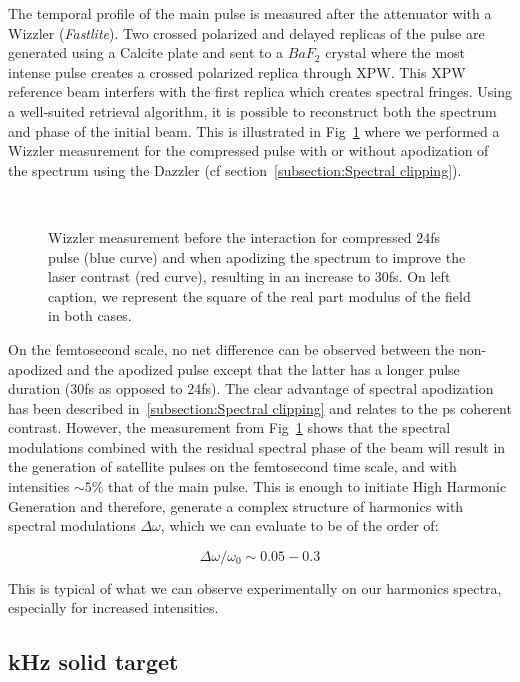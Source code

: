 The temporal profile of the main pulse is measured after the attenuator with a Wizzler (\textit{Fastlite}). Two crossed polarized and delayed replicas of the pulse are generated using a Calcite plate and sent to a $BaF_2$ crystal where the most intense pulse creates a crossed polarized replica through XPW. This XPW reference beam interfers with the first replica which creates spectral fringes. Using a well-suited retrieval algorithm, it is possible to reconstruct both the spectrum and phase of the initial beam. This is illustrated in Fig~\ref{fig:PWizzler_20150401} where we performed a Wizzler measurement for the compressed pulse with or without apodization of the spectrum using the Dazzler (cf section~\ref{subsection:Spectral clipping}).

\begin{figure}[H]
\centering
{}\\
\caption{\label{fig:PWizzler_20150401} Wizzler measurement before the interaction for compressed $24$fs pulse (blue curve) and when apodizing the spectrum to improve the laser contrast (red curve), resulting in an increase to 30fs. On left caption, we represent the square of the real part modulus of the field in both cases.}
\end{figure}

\noindent  On the femtosecond scale, no net difference can be observed between the non-apodized and the apodized pulse except that the latter has a longer pulse duration (30fs as opposed to 24fs). The clear advantage of spectral apodization has been described in~\ref{subsection:Spectral clipping} and relates to the ps coherent contrast. However, the measurement from Fig~\ref{fig:PWizzler_20150401} shows that the spectral modulations combined with the residual spectral phase of the beam will result in the generation of satellite pulses on the femtosecond time scale, and with intensities $\sim 5\mathrm{\%}$ that of the main pulse. This is enough to initiate High Harmonic Generation and therefore, generate a complex structure of harmonics with spectral modulations $\Delta \omega$, which we can evaluate to be of the order of:

$$
\Delta \omega / \omega_0 \sim 0.05-0.3
$$

\noindent This is typical of what we can observe experimentally on our harmonics spectra, especially for increased intensities.

\subsection{kHz solid target}

